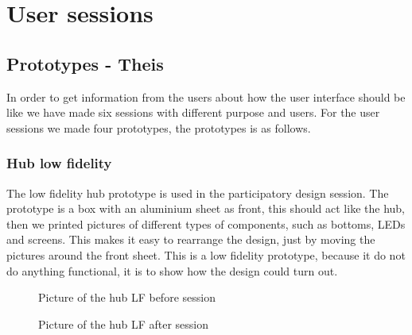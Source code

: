 \chapter{User sessions}
\section{Prototypes - Theis}
In order to get information from the users about how the user interface should be like we have made six sessions with different purpose and users. For the user sessions we made four prototypes, the prototypes is as follows.

\subsection{Hub low fidelity}
The low fidelity hub prototype is used in the participatory design session. The prototype is a box with an aluminium sheet as front, this should act like the hub, then we printed pictures of different types of components, such as bottoms, LEDs and screens. This makes it easy to rearrange the design, just by moving the pictures around the front sheet. This is a low fidelity prototype, because it do not do anything functional, it is to show how the design could turn out.
\begin{figure}[h!]
	\center
		\setlength\fboxsep{0pt}
		\setlength\fboxrule{1pt}
   	\caption{Picture of the hub LF before session}
   	\label{fig:LF hub before session}
\end{figure}
\begin{figure}[h!]
	\center
		\setlength\fboxsep{0pt}
		\setlength\fboxrule{1pt}
   	\caption{Picture of the hub LF after session}
   	\label{fig:LF hub after session}
\end{figure}

